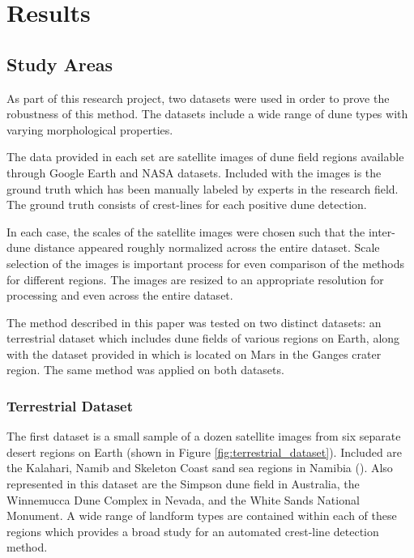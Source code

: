 \section{Results}

\subsection{Study Areas}

As part of this research project, two datasets were used in order to prove the robustness of this method. The datasets include a wide range of dune types with varying morphological properties.

The data provided in each set are satellite images of dune field regions available through Google Earth and NASA datasets. Included with the images is the ground truth which has been manually labeled by experts in the research field. The ground truth consists of crest-lines for each positive dune detection.

In each case, the scales of the satellite images were chosen such that the inter-dune distance appeared roughly normalized across the entire dataset. Scale selection of the images is important process for even comparison of the methods for different regions. The images are resized to an appropriate resolution for processing and even across the entire dataset.

The method described in this paper was tested on two distinct datasets: an terrestrial dataset which includes dune fields of various regions on Earth, along with the dataset provided in \cite{vaz_object_based_dune_analysis} which is located on Mars in the Ganges crater region. The same method was applied on both datasets.

\subsubsection{Terrestrial Dataset}
\label{subsec:terrestrial_dataset}
The first dataset is a small sample of a dozen satellite images from six separate desert regions on Earth (shown in Figure \ref{fig:terrestrial_dataset}). Included are the Kalahari, Namib and Skeleton Coast sand sea regions in Namibia (\cite{goudie_desert_landforms_namibia}). Also represented in this dataset are the Simpson dune field in Australia, the Winnemucca Dune Complex in Nevada, and the White Sands National Monument. A wide range of landform types are contained within each of these regions which provides a broad study for an automated crest-line detection method. 


